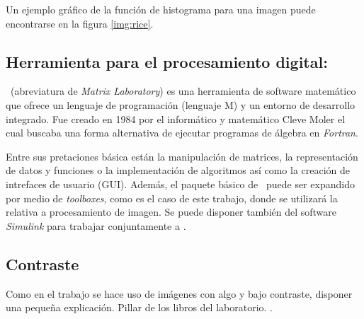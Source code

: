 Un ejemplo gráfico de la función de histograma para una imagen puede encontrarse en la figura \ref{img:rice}.


\subsection{Herramienta para el procesamiento digital: \MATLAB}
\MATLAB\ (abreviatura de {\em Matrix Laboratory}) es una herramienta de software matemático que ofrece un lenguaje de programación (lenguaje M) y un entorno de desarrollo integrado. Fue creado en 1984 por el informático y matemático Cleve Moler el cual buscaba una forma alternativa de ejecutar programas de álgebra en {\em Fortran}.

Entre sus pretaciones básica están la manipulación de matrices, la representación de datos y funciones o la implementación de algoritmos así como la creación de intrefaces de usuario (GUI). Además, el paquete básico de \MATLAB\ puede ser expandido por medio de {\em toolboxes}, como es el caso de este trabajo, donde se utilizará la relativa  a procesamiento de imagen. Se puede disponer también del software {\em Simulink} para trabajar conjuntamente a \MATLAB.

\subsection{Contraste}
Como en el trabajo se hace uso de imágenes con algo y bajo contraste, disponer una pequeña explicación. Pillar de los libros del laboratorio. .

